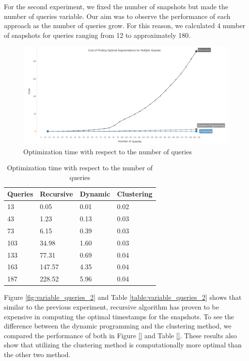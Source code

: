 			For the second experiment, we fixed the number of snapshots but made the number of queries variable. Our aim was to observe the performance of each approach as the number of queries grow. For this reason, we calculated 4 number of snapshots for queries ranging from 12 to approximately 180. 

			\begin{figure}
				\centering
				\includegraphics[width=\textwidth]{figs/multi_query.jpg}
				\caption{Optimization time with respect to the number of queries}
				\label{fig:variable_queries}
			\end{figure} 


			\begin {center}
			\begin{table}
				\centering
				\caption{Optimization time with respect to the number of queries}
				\label {table:variable_queries}
				\begin{tabular}{p{2cm}p{3cm}p{3cm}p{3cm}}
					\hline
					Queries & Recursive      & Dynamic  & Clustering \\ \hline
					13 & 0.05    & 0.01  & 0.02  \\  
					43 & 1.23    & 0.13  & 0.03  \\
					73 & 6.15    & 0.39  & 0.03  \\
					103 & 34.98 & 1.60  & 0.03  \\
					133 & 77.31 & 0.69  & 0.04 \\
					163 & 147.57 & 4.35  & 0.04  \\
					187 & 228.52 & 5.96  & 0.04  \\\hline
				\end{tabular}
			\end{table}
			\end{center}

			Figure \ref{fig:variable_queries_2} and Table \ref{table:variable_queries_2} shows that similar to the previous experiment, recursive algorithm has proven to be expensive in computing the optimal timestamps for the snapshots. To see the difference between the dynamic programming and the clustering method, we compared the performance of both in Figure \ref{} and Table \ref{}. These results also show that utilizing the clustering method is computationally more optimal than the other two method.

